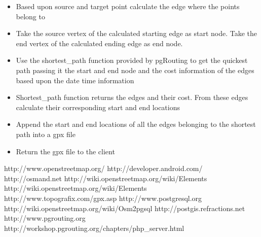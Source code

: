 \documentclass[a4paper,12pt, notitlepage, oneside, onecolumn]{article}
\begin{document}
\begin{itemize}
\item Based upon source and target point calculate the edge where the points belong to
\item Take the source vertex of the calculated starting edge as start node. Take the end vertex of the calculated ending edge as end node. 
\item Use the shortest\_path function provided by pgRouting to get the quickest path passing it the start and end node and the cost information of the edges based upon the date time information
\item Shortest\_path function returns the edges and their cost. From these edges calculate their corresponding start and end locations
\item Append the start and end locations of all the edges belonging to the shortest path into a gpx file
\item Return the gpx file to the client
\end{itemize}

\newpage
\begin{thebibliography}{50}
 http://www.openstreetmap.org/
 http://developer.android.com/
 http://osmand.net
http://wiki.openstreetmap.org/wiki/Elements
http://wiki.openstreetmap.org/wiki/Elements
 http://www.topografix.com/gpx.asp
 http://www.postgresql.org
 http://wiki.openstreetmap.org/wiki/Osm2pgsql
 http://postgis.refractions.net
 http://www.pgrouting.org
 http://workshop.pgrouting.org/chapters/php\_server.html
\end{thebibliography}
\end{document}

